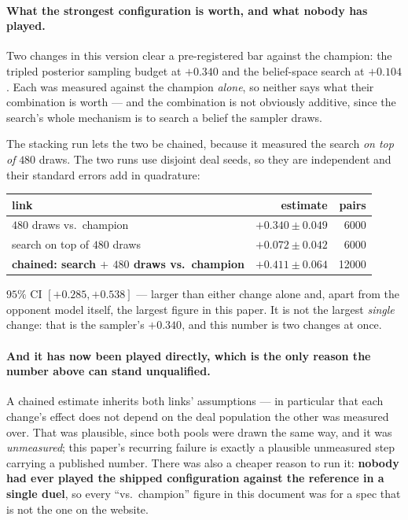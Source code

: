 \documentclass[11pt,a4paper]{article}
\begin{document}
\paragraph{What the strongest configuration is worth, and what nobody has
played.} Two changes in this version clear a pre-registered bar against the
champion: the tripled posterior sampling budget at $+0.340$ and the
belief-space search at $+0.104$. Each was measured against the champion
\emph{alone}, so neither says what their combination is worth --- and the
combination is not obviously additive, since the search's whole mechanism is to
search a belief the sampler draws.

The stacking run lets the two be chained, because it measured the search
\emph{on top of} $480$ draws. The two runs use disjoint deal seeds, so they are
independent and their standard errors add in quadrature:
\begin{center}
\begin{tabular}{lrr}
\toprule
link & estimate & pairs \\
\midrule
$480$ draws vs.\ champion & $+0.340 \pm 0.049$ & 6000 \\
search on top of $480$ draws & $+0.072 \pm 0.042$ & 6000 \\
\midrule
\textbf{chained: search $+$ $480$ draws vs.\ champion}
  & $\mathbf{+0.411 \pm 0.064}$ & 12000 \\
\bottomrule
\end{tabular}
\end{center}
$95\%$ CI $[+0.285, +0.538]$ --- larger than either change alone and, apart
from the opponent model itself, the largest figure in this paper. It is not the
largest \emph{single} change: that is the sampler's $+0.340$, and this number is
two changes at once.

\paragraph{And it has now been played directly, which is the only reason the
number above can stand unqualified.} A chained estimate inherits both links'
assumptions --- in particular that each change's effect does not depend on the
deal population the other was measured over. That was plausible, since both
pools were drawn the same way, and it was \emph{unmeasured}; this paper's
recurring failure is exactly a plausible unmeasured step carrying a published
number. There was also a cheaper reason to run it: \textbf{nobody had ever
played the shipped configuration against the reference in a single duel}, so
every ``vs.\ champion'' figure in this document was for a spec that is not the
one on the website.
\end{document}
